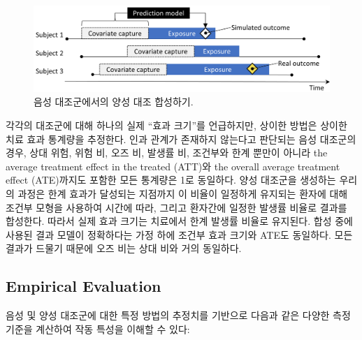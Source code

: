 \documentclass[11pt]{book}
\theoremstyle{definition}
\theoremstyle{definition}
\theoremstyle{definition}
\theoremstyle{remark}
\begin{document}
\begin{figure}

{\centering \includegraphics[width=0.9\linewidth]{images/MethodValidity/posControlSynth} 

}

\caption{음성 대조군에서의 양성 대조 합성하기.}\label{fig:posControlSynth}
\end{figure}

각각의 대조군에 대해 하나의 실제 ``효과 크기''를 언급하지만, 상이한
방법은 상이한 치료 효과 통계량을 추정한다. 인과 관계가 존재하지 않는다고
판단되는 음성 대조군의 경우, 상대 위험, 위험 비, 오즈 비, 발생률 비,
조건부와 한계 뿐만이 아니라 the average treatment effect in the treated
(ATT)와 the overall average treatment effect (ATE)까지도 포함한 모든
통계량은 1로 동일하다. 양성 대조군을 생성하는 우리의 과정은 한계 효과가
달성되는 지점까지 이 비율이 일정하게 유지되는 환자에 대해 조건부 모형을
사용하여 시간에 따라, 그리고 환자간에 일정한 발생률 비율로 결과를
합성한다. 따라서 실제 효과 크기는 치료에서 한계 발생률 비율로 유지된다.
합성 중에 사용된 결과 모델이 정확하다는 가정 하에 조건부 효과 크기와
ATE도 동일하다. 모든 결과가 드물기 때문에 오즈 비는 상대 비와 거의
동일하다.

\subsection{Empirical Evaluation}\label{metrics}


음성 및 양성 대조군에 대한 특정 방법의 추정치를 기반으로 다음과 같은
다양한 측정 기준을 계산하여 작동 특성을 이해할 수 있다:
\end{document}
